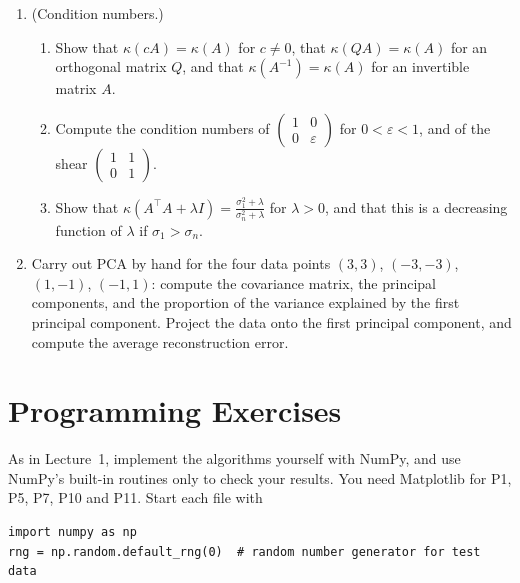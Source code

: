 \begin{enumerate}[leftmargin=*]
\begin{enumerate}[label=(\alph*)]
        \item the singular values of a symmetric matrix are the absolute values of its nonzero eigenvalues;
        \item $A^\top A$ and $AA^\top$ have the same nonzero eigenvalues;
        \item $\norm{A}_2 = \norm{A^\top}_2$.
    \end{enumerate}
    \item (Condition numbers.)
    \begin{enumerate}
        \item Show that $\kappa(cA) = \kappa(A)$ for $c \neq 0$, that $\kappa(QA) = \kappa(A)$ for an orthogonal matrix $Q$, and that $\kappa(A^{-1}) = \kappa(A)$ for an invertible matrix $A$.
        \item Compute the condition numbers of $\begin{pmatrix} 1 & 0 \\ 0 & \varepsilon \end{pmatrix}$ for $0 < \varepsilon < 1$, and of the shear $\begin{pmatrix} 1 & 1 \\ 0 & 1 \end{pmatrix}$.
        \item Show that $\kappa(A^\top A + \lambda I) = \frac{\sigma_1^2 + \lambda}{\sigma_n^2 + \lambda}$ for $\lambda > 0$, and that this is a decreasing function of $\lambda$ if $\sigma_1 > \sigma_n$.
    \end{enumerate}
    \item \homework{} Carry out PCA by hand for the four data points $(3, 3)$, $(-3, -3)$, $(1, -1)$, $(-1, 1)$: compute the covariance matrix, the principal components, and the proportion of the variance explained by the first principal component. Project the data onto the first principal component, and compute the average reconstruction error.
\end{enumerate}

\section{Programming Exercises}\label{L2-sec:programming}

\setlength{\emergencystretch}{3em}

As in Lecture~1, implement the algorithms yourself with NumPy, and use NumPy's built-in routines only to check your results. You need Matplotlib for P1, P5, P7, P10 and P11. Start each file with
\begin{lstlisting}
import numpy as np
rng = np.random.default_rng(0)  # random number generator for test data
\end{lstlisting}

